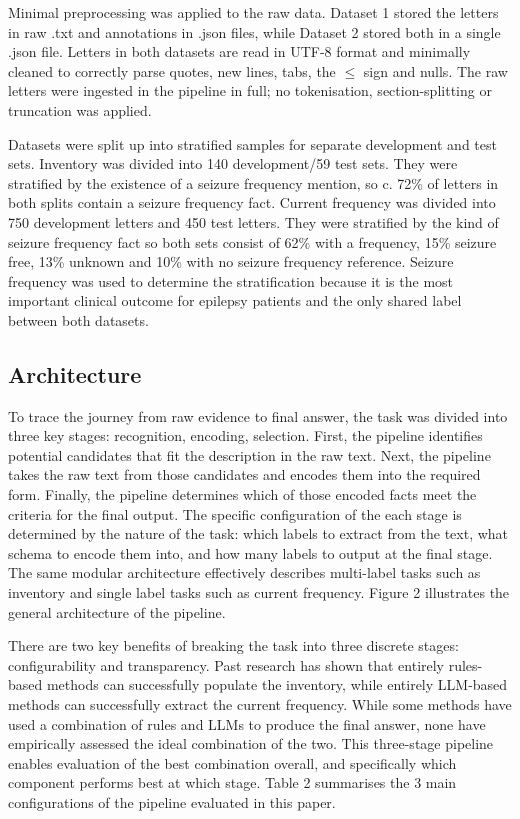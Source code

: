 \documentclass[conference]{IEEEtran}
\begin{document}
Minimal preprocessing was applied to the raw data.
Dataset 1 stored the letters in raw .txt and annotations 
in .json files, while Dataset 2 stored both in a single 
.json file. Letters in both datasets are read in UTF-8 
format and minimally cleaned to correctly parse 
quotes, new lines, tabs, the $\leq$ sign and nulls. 
The raw letters were ingested in the pipeline in full; 
no tokenisation, section-splitting or truncation was
applied. 

Datasets were split up into stratified samples for 
separate development and test sets. Inventory 
was divided into 140 development/59 test sets. They 
were stratified by the existence of a seizure frequency 
mention, so c. 72\% of letters in both splits contain a 
seizure frequency fact. Current frequency was divided 
into 750 development letters and 450 test letters. They
were stratified by the kind of
seizure frequency fact so both sets consist of 
62\% with a frequency, 15\% seizure free, 13\% 
unknown and 10\% with no seizure frequency reference.
Seizure frequency was used to determine the
stratification because it is the most important 
clinical outcome for epilepsy patients and the 
only shared label between both datasets. 

\subsection{Architecture}

To trace the journey from raw evidence to final answer, 
the task was divided into three key stages: recognition,
encoding, selection. First, the pipeline identifies 
potential candidates that fit the description in the raw
text. Next, the pipeline takes the raw text from those
candidates and encodes them into the required form.
Finally, the pipeline determines which of those 
encoded facts meet the criteria for the final output. 
The specific configuration of the each stage is 
determined by the nature of the task: which labels to 
extract from the text, what schema to encode them 
into, and how many labels to output at the final stage.
The same modular architecture effectively describes
multi-label tasks such as inventory and single label 
tasks such as current frequency. Figure 2 illustrates the 
general architecture of the pipeline. 

There are two key benefits of breaking the task into 
three discrete stages: configurability and transparency. Past 
research has shown that entirely rules-based methods 
can successfully populate the inventory, while entirely
LLM-based methods can successfully extract the 
current frequency. While some methods have used a
combination of rules and LLMs to produce the final 
answer, none have empirically assessed the ideal 
combination of the two. This three-stage pipeline enables 
evaluation of the best combination overall, and specifically 
which component performs best at which stage. Table 2 
summarises the 3 main configurations of the pipeline 
evaluated in this paper. 
\end{document}
